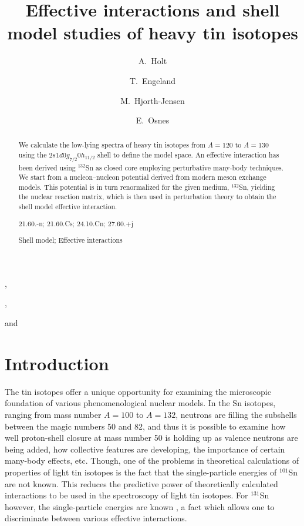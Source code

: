 



\begin{frontmatter}

\title{Effective interactions and shell model studies of heavy tin isotopes}


\author[oslo]{A.\ Holt},
\author[oslo]{T.\ Engeland}, 
\author[nordita]{M.\ Hjorth-Jensen} and
\author[oslo]{E.\ Osnes}
\address[oslo]{Department of Physics,
         University of Oslo, N-0316 Oslo, Norway}
\address[nordita]{Nordita, Blegdamsvej 17, DK-2100 K\o benhavn \O, Denmark}

\maketitle

\begin{abstract}
We calculate the low-lying spectra of heavy tin isotopes from $A=120$ to 
$A=130$ using the $2s1d0g_{7/2}0h_{11/2}$ shell to define the model
space. An effective interaction has been derived using $^{132}$Sn as
closed core  employing perturbative many-body techniques.
We start from a nucleon--nucleon potential derived from modern meson exchange
models. This potential is in turn renormalized for the given medium, 
$^{132}$Sn, yielding the nuclear reaction matrix, which is then used in 
perturbation theory to obtain the shell model effective interaction.

 21.60.-n; 21.60.Cs; 24.10.Cn; 27.60.+j 

  Shell model; Effective interactions

\end{abstract}

\end{frontmatter}


\section{Introduction}

The tin isotopes offer a unique opportunity for examining the
microscopic foundation of various phenomenological nuclear
models. In the Sn isotopes, ranging from mass number $A=100$ to
$A=132$, neutrons are filling the subshells between the magic
numbers 50 and 82, and thus it is possible to examine how well
proton-shell closure at mass number 50 is holding up as valence
neutrons are being added, how collective features are developing,
the importance of certain many-body effects, etc.
Though, one of the problems in theoretical calculations
of properties of light tin isotopes is the fact that the 
single-particle energies of $^{101}$Sn are not known. 
This reduces the predictive power of theoretically calculated
interactions to be used in the spectroscopy of light tin isotopes.
For $^{131}$Sn however, the single-particle energies are known \cite{bf84},
a fact which allows one to discriminate between various effective 
interactions. 

